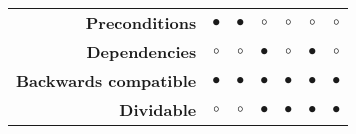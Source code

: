 {\begin{landscape}
\begin{table}[h]
\begin{tabular}{rcccccc}
{\bf Preconditions}                         & $\bullet$             & $\bullet$     & $\circ$             & $\circ$               & $\circ$           & $\circ$               \\
{\bf Dependencies}                        & $\circ$               & $\circ$       & $\bullet$           & $\circ$               & $\bullet$         & $\circ$               \\
{\bf Backwards compatible}             & $\bullet$             & $\bullet$     & $\bullet$           & $\bullet$             & $\bullet$         & $\bullet$             \\
{\bf Dividable}                                & $\circ$               & $\circ$       & $\bullet$           & $\bullet$             & $\bullet$         & $\bullet$             \\ \hline
\end{tabular}
\vspace*{0.5cm}
\newline


\end{table}
\end{landscape}}
